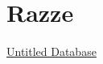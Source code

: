 \section{Razze}\label{razze}

\href{Untitled\%20Database\%207a090bf8f59142a7b3145cfdd5dec00e.csv}{Untitled
Database}
